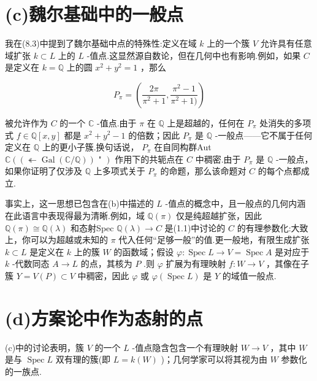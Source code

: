\section{(c)魏尔基础中的一般点}

我在(8.3)中提到了魏尔基础中点的特殊性:定义在域 \(k\) 上的一个簇 \(V\) 允许具有任意域扩张 \(k \subset  L\) 上的 \(L\) -值点.这显然源自数论，但在几何中也有影响.例如，如果 \(C\) 是定义在 \(k = \mathbb{Q}\) 上的圆 \({x}^{2} + {y}^{2} = 1\) ，那么

\[
{P}_{\pi } = \left( {\frac{2\pi }{{\pi }^{2} + 1},\frac{{\pi }^{2} - 1}{{\pi }^{2} + 1)}}\right)
\]

被允许作为 \(C\) 的一个 \(\mathbb{C}\) -值点.由于 \(\pi\) 在 \(\mathbb{Q}\) 上是超越的，任何在 \({P}_{\pi }\) 处消失的多项式 \(f \in  \mathbb{Q}\left\lbrack  {x,y}\right\rbrack\) 都是 \({x}^{2} + {y}^{2} - 1\) 的倍数；因此 \({P}_{\pi }\) 是 \(\mathbb{Q}\) -一般点——它不属于任何定义在 \(\mathbb{Q}\) 上的更小子簇.换句话说， \({P}_{\pi }\) 在自同构群Aut \(\mathbb{C}\left( {\left( { \twoheadleftarrow  \operatorname{Gal}\left( {\mathbb{C}/\mathbb{Q}}\right) }\right) \text{ " }}\right)\) 作用下的共轭点在 \(C\) 中稠密.由于 \({P}_{\pi }\) 是 \(\mathbb{Q}\) -一般点，如果你证明了仅涉及 \(\mathbb{Q}\) 上多项式关于 \({P}_{\pi }\) 的命题，那么该命题对 \(C\) 的每个点都成立.

事实上，这一思想已包含在(b)中描述的 \(L\) -值点的概念中，且一般点的几何内涵在此语言中表现得最为清晰.例如，域 \(\mathbb{Q}\left( \pi \right)\) 仅是纯超越扩张，因此 \(\mathbb{Q}\left( \pi \right)  \cong  \mathbb{Q}\left( \lambda \right)\) 和态射Spec \(\mathbb{Q}\left( \lambda \right)  \rightarrow  C\) 是(1.1)中讨论的 \(C\) 的有理参数化:大致上，你可以为超越或未知的 \(\pi\) 代入任何“足够一般”的值.更一般地，有限生成扩张 \(k \subset  L\) 是定义在 \(k\) 上的簇 \(W\) 的函数域；假设 \(\varphi  : \operatorname{Spec}L \rightarrow  V = \operatorname{Spec}A\) 是对应于 \(k\) -代数同态 \(A \rightarrow  L\) 的点，其核为 \(P\) .则 \(\varphi\) 扩展为有理映射 \(f : W \rightarrow  V\) ，其像在子簇 \(Y = V\left( P\right)  \subset  V\) 中稠密，因此 \(\varphi\) 或 \(\varphi \left( {\operatorname{Spec}L}\right)\) 是 \(Y\) 的域值一般点.

\section{(d)方案论中作为态射的点}

(c)中的讨论表明，簇 \(V\) 的一个 \(L\) -值点隐含包含一个有理映射 \(W \rightarrow  V\) ，其中 \(W\) 是与 \(\operatorname{Spec}L\) 双有理的簇(即 \(L = k\left( W\right)\) )；几何学家可以将其视为由 \(W\) 参数化的一族点.

